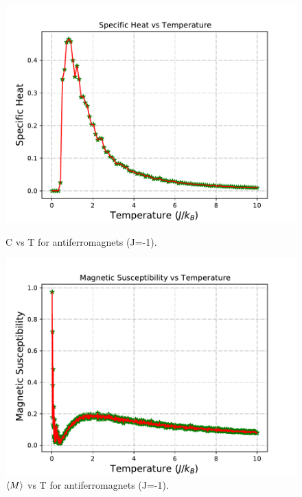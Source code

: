 \documentclass[12pt]{article}
\begin{document}
	\begin{figure}[H]
		\begin{minipage}[t]{0.5\textwidth}
			\centering
			\includegraphics[scale=0.5]{C vs T (J=1).pdf}
			\setcaptionwidth{3in}
			\caption{C vs T for antiferromagnets (J=-1). }
			\label{fig: low start specific heat for antiferromagnet}
		\end{minipage}
		\begin{minipage}[t]{0.5\textwidth}
			\centering
			\includegraphics[scale=0.5]{X vs T (Low, J=-1).pdf}
			\setcaptionwidth{3in}
			\caption{$\braket{M}$ vs T for antiferromagnets (J=-1).}
			\label{fig: low start suspecibility for antiferromagnet}
		\end{minipage}
	\end{figure}
	
\end{document}
